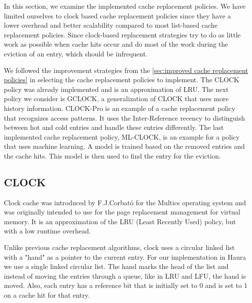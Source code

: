 \documentclass[
	12pt,
	a4paper,
	abstract,
	bibliography=totoc,
	chapterprefix,
	headings=openright,
	numbers=endperiod,
	parskip=half,
	twoside,
]{scrreprt}
\begin{document}
In this section, we examine the implemented cache replacement policies.
We have limited ourselves to clock based cache replacement policies since they have a lower overhead 
and better scalability 
compared to most list-based cache replacement policies.
Since clock-based replacement strategies try to do as little work as possible when cache hits occur and 
do most of the work during the eviction of an entry, which should be infrequent.

We followed the improvement strategies from the \cref{sec:improved cache replacement policies}
in selecting the cache replacement policies to implement.
The CLOCK policy was already implemented and is an approximation of LRU.
The next policy we consider is GCLOCK, a generalization of CLOCK that uses more history information.
CLOCK-Pro is an example of a cache replacement policy that recognizes access patterns.
It uses the Inter-Reference recency to distinguish between hot and cold entries and handle these entries differently.
The last implemented cache replacement policy, ML-CLOCK, is an example for a policy that uses machine learning.
A model is trained based on the removed entries and the cache hits. 
This model is then used to find the entry for the eviction.

\subsection{CLOCK}

Clock cache was introduced by F.J.Corbató \cite{corbato1968paging} for the Multics operating system and was originally intended 
to use for the page replacement management for virtual memory.
It is an approximation of the LRU (Least Recently Used) policy, but with a low runtime overhead.

Unlike previous cache replacement algorithms, clock uses a circular linked list with a "hand" as a pointer to the current entry.
For our implementation in Haura we use a single linked circular list.
The hand marks the head of the list and instead of moving the entries through a queue, like in LRU and LFU, the hand is moved.
Also, each entry has a reference bit that is initially set to 0 and is set to 1 on a cache hit for that entry.
\end{document}
